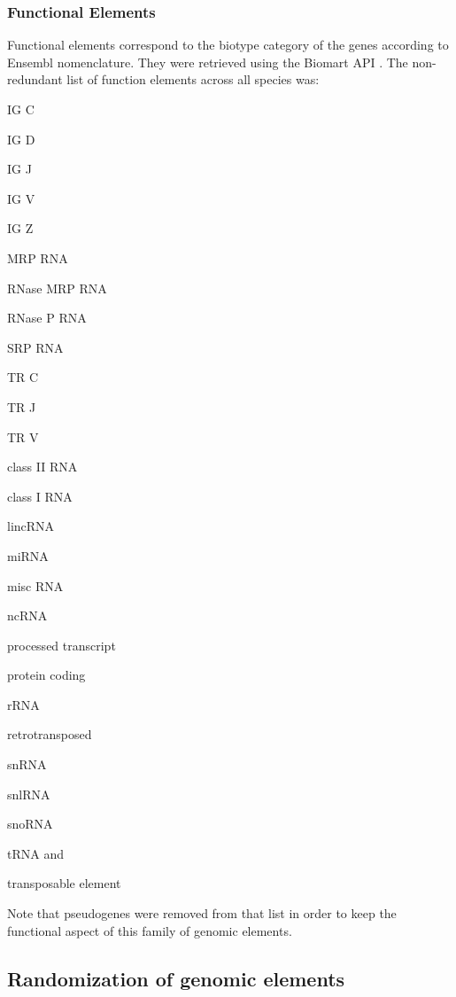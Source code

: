 \subsubsection{Functional Elements}

Functional elements correspond to the biotype category of the genes according to Ensembl \cite{Flicek2011} nomenclature. They were retrieved using the Biomart API \cite{Kinsella2011}. The non-redundant list of function elements across all species was:

\begin{inparaenum}[\itshape 1-]
  \item IG C
  \item IG D
  \item IG J
  \item IG V
  \item IG Z
  \item MRP RNA
  \item RNase MRP RNA
  \item RNase P RNA
  \item SRP RNA
  \item TR C
  \item TR J
  \item TR V
  \item class II RNA
  \item class I RNA
  \item lincRNA
  \item miRNA
  \item misc RNA
  \item ncRNA
  \item processed transcript
  \item protein coding
  \item rRNA
  \item retrotransposed
  \item snRNA
  \item snlRNA
  \item snoRNA
  \item tRNA
  and \item transposable element
\end{inparaenum}

Note that pseudogenes were removed from that list in order to keep the functional aspect of this family of genomic elements.

\subsection{Randomization of genomic elements}


